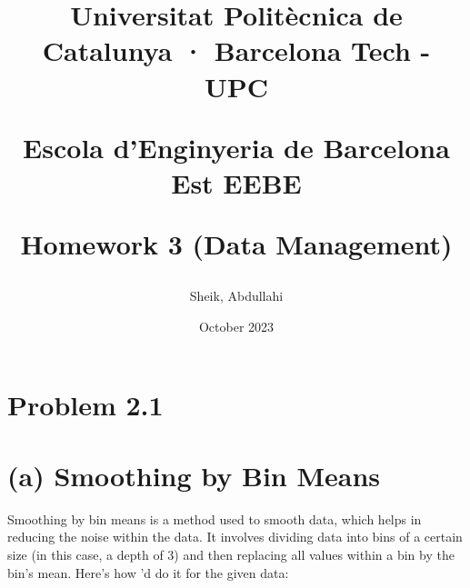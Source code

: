\documentclass{article}
\begin{document}
\title{Universitat Politècnica de Catalunya · Barcelona Tech - UPC

Escola d'Enginyeria de Barcelona Est EEBE

Homework 3 (Data Management)}
\author{Sheik, Abdullahi}
\date{October 2023}
\maketitle
\section*{Problem 2.1}

\section*{(a) Smoothing by Bin Means}

Smoothing by bin means is a method used to smooth data, which helps in reducing the noise within the data. It involves dividing data into bins of a certain size (in this case, a depth of 3) and then replacing all values within a bin by the bin's mean. Here's how 'd do it for the given data:
\end{document}
